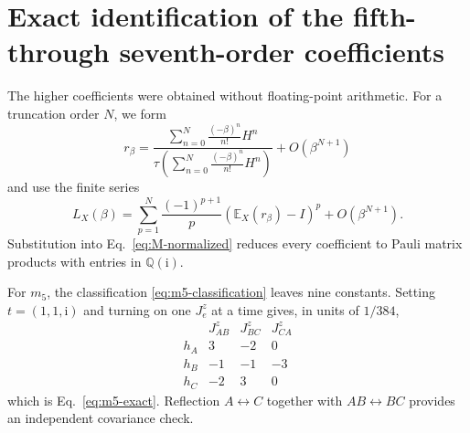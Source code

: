 \documentclass[11pt]{article}
\newcommand{\ii}{\mathrm{i}}
\newcommand{\E}{\mathbb{E}}
\begin{document}
\section{Exact identification of the fifth- through seventh-order coefficients}
\label{app:higher-orders}

The higher coefficients were obtained without floating-point arithmetic.  For
a truncation order $N$, we form
\begin{equation}
 r_\beta=
 \frac{\displaystyle\sum_{n=0}^N\frac{(-\beta)^n}{n!}H^n}
 {\displaystyle\tau\left(\sum_{n=0}^N\frac{(-\beta)^n}{n!}H^n\right)}
 +O(\beta^{N+1})
 \label{eq:exact-r-series}
\end{equation}
and use the finite series
\begin{equation}
 L_X(\beta)=
 \sum_{p=1}^N\frac{(-1)^{p+1}}{p}
 \left(\E_X(r_\beta)-I\right)^p+O(\beta^{N+1}).
 \label{eq:exact-log-series}
\end{equation}
Substitution into Eq.~\eqref{eq:M-normalized} reduces every coefficient to
Pauli matrix products with entries in $\mathbb Q(\ii)$.

For $m_5$, the classification \eqref{eq:m5-classification} leaves nine
constants.  Setting $t=(1,1,\ii)$ and turning on one $J_e^z$ at a time gives,
in units of $1/384$,
\begin{equation}
\begin{array}{c|rrr}
 &J_{AB}^z&J_{BC}^z&J_{CA}^z\\
\hline
h_A&3&-2&0\\
h_B&-1&-1&-3\\
h_C&-2&3&0
\end{array}
\label{eq:m5-coefficient-table}
\end{equation}
which is Eq.~\eqref{eq:m5-exact}.  Reflection
$A\leftrightarrow C$ together with $AB\leftrightarrow BC$ provides an
independent covariance check.
\end{document}
